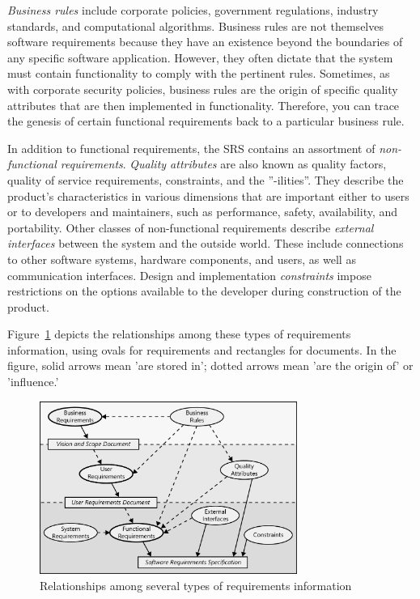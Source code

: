 \documentclass[dissertation,final]{softeng}
\begin{document}
\emph{Business rules} include corporate policies, government regulations, industry standards, and computational algorithms. Business rules are not themselves software requirements because they have an existence beyond the boundaries of any specific software application. However, they often dictate that the system must contain functionality to comply with the pertinent rules. Sometimes, as with corporate security policies, business rules are the origin of specific quality attributes that are then implemented in functionality. Therefore, you can trace the genesis of certain functional requirements back to a particular business rule.

In addition to functional requirements, the SRS contains an assortment of \emph{non-functional requirements}. \emph{Quality attributes} are also known as quality factors, quality of service requirements, constraints, and the ''-ilities''. They describe the product's characteristics in various dimensions that are important either to users or to developers and maintainers, such as performance, safety, availability, and portability. Other classes of non-functional requirements describe \emph{external interfaces} between the system and the outside world. These include connections to other software systems, hardware components, and users, as well as communication interfaces. Design and implementation \emph{constraints} impose restrictions on the options available to the developer during construction of the product.

Figure~\ref{fig:types_of_requirements} depicts the relationships among these types of requirements information, using ovals for requirements and rectangles for documents. In the figure, solid arrows mean 'are stored in'; dotted arrows mean 'are the origin of' or 'influence.'
\begin{figure}[h!]
\includegraphics[width=0.75\textwidth]{TypesOfRequirements}
\centering
\caption[Types of Requirements]{Relationships among several types of requirements information~\citep[p. 8]{Wiegers2013}}
\label{fig:types_of_requirements}
\end{figure}
\end{document}
